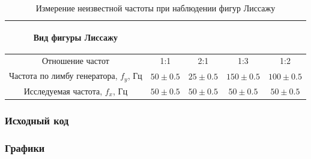 \begin{center}
\begin{table}[h!]
\centering
\caption{Измерение неизвестной частоты при наблюдении фигур Лиссажу}
\label{tabl:1}
\begin{tabular}{|c|c|c|c|c|}
\hline
\begin{minipage}{8cm}
\begin{center}
    Вид фигуры Лиссажу
\end{center}
\end{minipage} &
\begin{minipage}{2cm}
\begin{center}

\end{center}
\end{minipage} &
\begin{minipage}{2cm}
\begin{center}
    
    \end{center}
\end{minipage} &
\begin{minipage}{2cm}
\begin{center}

\end{center}
\end{minipage} &
\begin{minipage}{2cm}
\begin{center}
        
    \end{center}
\end{minipage}\\
\hline
Отношение частот  &  1:1 &  2:1 & 1:3 & 1:2 \\
Частота по лимбу генератора, $f_y$, Гц &  $50\pm{}0.5$  & $25\pm{}0.5$ & $150\pm{}0.5$ & $100\pm{}0.5$\\
Исследуемая частота, $f_x$, Гц  &  $50\pm{}0.5$  &  $50\pm{}0.5$ & $50\pm{}0.5$ & $50\pm{}0.5$ \\

\hline
\end{tabular}
\end{table}
\end{center}
\subsubsection{Исходный код}



\subsubsection{Графики}

